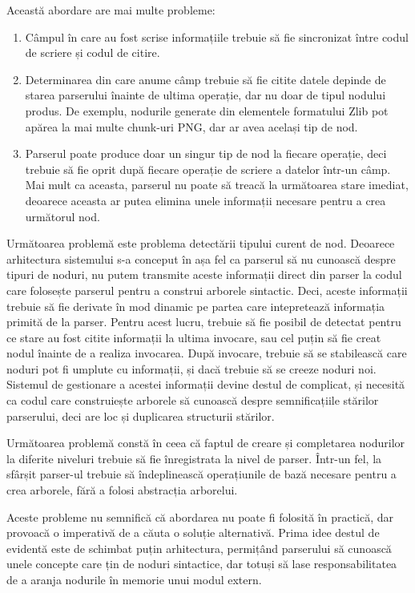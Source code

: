 \documentclass[a4paper,12pt]{report}
\begin{document}
Această abordare are mai multe probleme:
\begin{enumerate}
    \item
        Câmpul în care au fost scrise informațiile trebuie să fie sincronizat
        între codul de scriere și codul de citire.
    \item
        Determinarea din care anume câmp trebuie să fie citite datele
        depinde de starea parserului înainte de ultima operație,
        dar nu doar de tipul nodului produs.
        De exemplu, nodurile generate din elementele formatului Zlib pot apărea
        la mai multe chunk-uri \ac{PNG}, dar ar avea același tip de nod.
    \item
        Parserul poate produce doar un singur tip de nod la fiecare operație, deci trebuie
        să fie oprit după fiecare operație de scriere a datelor într-un câmp.
        Mai mult ca aceasta, parserul nu poate să treacă la următoarea stare imediat,
        deoarece aceasta ar putea elimina unele informații necesare pentru a crea următorul nod.
\end{enumerate}

Următoarea problemă este problema detectării tipului curent de nod.
Deoarece arhitectura sistemului s-a conceput în așa fel ca parserul să nu cunoască despre tipuri de noduri,
nu putem transmite aceste informații direct din parser la codul care folosește parserul pentru
a construi arborele sintactic.
Deci, aceste informații trebuie să fie derivate în mod dinamic pe partea
care intepretează informația primită de la parser.
Pentru acest lucru, trebuie să fie posibil de detectat pentru ce stare au fost citite informații
la ultima invocare, sau cel puțin să fie creat nodul înainte de a realiza invocarea.
După invocare, trebuie să se stabilească care noduri pot fi umplute cu informații,
și dacă trebuie să se creeze noduri noi.
Sistemul de gestionare a acestei informații devine destul de complicat,
și necesită ca codul care construiește arborele să cunoască despre semnificațiile stărilor parserului,
deci are loc și duplicarea structurii stărilor.

Următoarea problemă constă în ceea că faptul de creare
și completarea nodurilor la diferite niveluri trebuie să fie înregistrata la nivel de parser.
Într-un fel, la sfârșit parser-ul trebuie să îndeplinească operațiunile
de bază necesare pentru a crea arborele, fără a folosi abstracția arborelui.

Aceste probleme nu semnifică că abordarea nu poate fi folosită în practică,
dar provoacă o imperativă de a căuta o soluție alternativă.
Prima idee destul de evidentă este de schimbat puțin arhitectura,
permițând parserului să cunoască unele concepte care țin de noduri sintactice,
dar totuși să lase responsabilitatea de a aranja nodurile în memorie unui modul extern.
\end{document}
